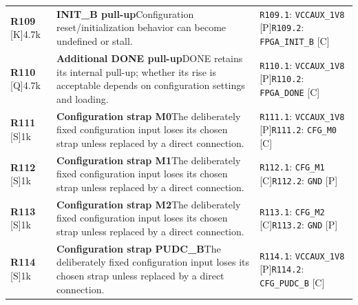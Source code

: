 \documentclass[11pt,a4paper]{article}
\begin{document}
\begin{longtable}{@{}P{27mm}P{77mm}P{62mm}@{}}
\textbf{R109} [K]\newline 4.7k & \textbf{INIT\_B pull-up}\newline Configuration reset/initialization behavior can become undefined or stall. & \nolinkurl{R109.1}: \nolinkurl{VCCAUX_1V8} [P]\newline \nolinkurl{R109.2}: \nolinkurl{FPGA_INIT_B} [C] \\
\textbf{R110} [Q]\newline 4.7k & \textbf{Additional DONE pull-up}\newline DONE retains its internal pull-up; whether its rise is acceptable depends on configuration settings and loading. & \nolinkurl{R110.1}: \nolinkurl{VCCAUX_1V8} [P]\newline \nolinkurl{R110.2}: \nolinkurl{FPGA_DONE} [C] \\
\textbf{R111} [S]\newline 1k & \textbf{Configuration strap M0}\newline The deliberately fixed configuration input loses its chosen strap unless replaced by a direct connection. & \nolinkurl{R111.1}: \nolinkurl{VCCAUX_1V8} [P]\newline \nolinkurl{R111.2}: \nolinkurl{CFG_M0} [C] \\
\textbf{R112} [S]\newline 1k & \textbf{Configuration strap M1}\newline The deliberately fixed configuration input loses its chosen strap unless replaced by a direct connection. & \nolinkurl{R112.1}: \nolinkurl{CFG_M1} [C]\newline \nolinkurl{R112.2}: \nolinkurl{GND} [P] \\
\textbf{R113} [S]\newline 1k & \textbf{Configuration strap M2}\newline The deliberately fixed configuration input loses its chosen strap unless replaced by a direct connection. & \nolinkurl{R113.1}: \nolinkurl{CFG_M2} [C]\newline \nolinkurl{R113.2}: \nolinkurl{GND} [P] \\
\textbf{R114} [S]\newline 1k & \textbf{Configuration strap PUDC\_B}\newline The deliberately fixed configuration input loses its chosen strap unless replaced by a direct connection. & \nolinkurl{R114.1}: \nolinkurl{VCCAUX_1V8} [P]\newline \nolinkurl{R114.2}: \nolinkurl{CFG_PUDC_B} [C] \\

\end{longtable}
\end{document}
